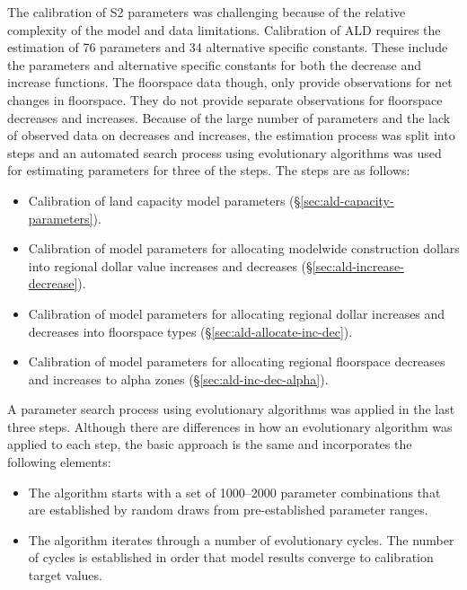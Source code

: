 The calibration of S2 parameters was challenging because of the relative complexity of the model and data limitations. Calibration of ALD requires the estimation of 76 parameters and 34 alternative specific constants. These include the parameters and alternative specific constants for both the decrease and increase functions. The floorspace data though, only provide observations for net changes in floorspace. They do not provide separate observations for floorspace decreases and increases. Because of the large number of parameters and the lack of observed data on decreases and increases, the estimation process was split into steps and an automated search process using evolutionary algorithms was used for estimating parameters for three of the steps. The steps are as follows:
\begin{itemize}
\item Calibration of land capacity model parameters (\S\ref{sec:ald-capacity-parameters}).
\item Calibration of model parameters for allocating modelwide construction dollars into regional dollar value increases and decreases (\S\ref{sec:ald-increase-decrease}).
\item Calibration of model parameters for allocating regional dollar increases and decreases into floorspace types (\S\ref{sec:ald-allocate-inc-dec}).
\item Calibration of model parameters for allocating regional floorspace decreases and increases to alpha zones (\S\ref{sec:ald-inc-dec-alpha}).
\end{itemize}

A parameter search process using evolutionary algorithms was applied in the last three steps. Although there are differences in how an evolutionary algorithm was applied to each step, the basic approach is the same and incorporates the following elements:
\begin{itemize}
\item The algorithm starts with a set of 1000--2000 parameter combinations that are established by random draws from pre-established parameter ranges.
\item The algorithm iterates through a number of evolutionary cycles. The number of cycles is established in order that model results converge to calibration target values. 
\end{itemize}

